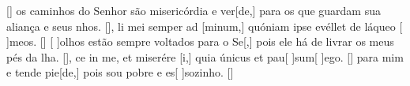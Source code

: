 {{  [\LinkLA]}%
    { os caminhos do Senhor são misericórdia e ver[de,] para os que guardam sua aliança e seus nhos. [\LinkPT]},
  {li mei semper ad [minum,] quóniam ipse
  evéllet de láqueo [ ]{me}os. [\LinkLA]}%
    {[ ]{o}lhos estão sempre voltados para o Se[,] pois ele há de livrar os meus pés da lha. [\LinkPT]},
  {ce in me, et miserére [i,] quia únicus et pau[ ]{sum}[ ]{e}go. [\LinkLA]}%
    { para mim e tende pie[de,] pois sou pobre e es[ ]{so}{zi}nho. [\LinkPT]}
}